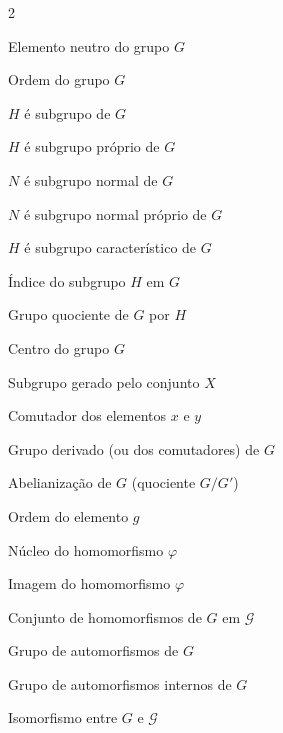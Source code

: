 \documentclass[16pt,openany]{book}
\theoremstyle{definition}
\newcommand{\trianglechareq}{
  \mathrel{
    \unitlength=1mm
    \begin{picture}(5,3)(0,-1.5)
      \polyline(0,0)(4,1.5)(4,-1.5)(0,0)
      \polyline(1.25,0)(3,0.75)(3,-0.75)(1.25,0)
      \polyline(0,-1.9)(4,-1.9)
    \end{picture}
  }
}
\begin{document}
\begin{multicols}{2}
    \begin{description}[leftmargin=2.2cm, labelwidth=1.8cm, labelsep=0.4cm, itemsep=0.3cm, font=\normalfont]
        \item[{ $e$ ou $e_G$}] Elemento neutro do grupo $G$
        \item[{ $|G|$ }] Ordem do grupo $G$
        \item[{ $H \le G$ }] $H$ é subgrupo de $G$
        \item[{ $H < G$ }] $H$ é subgrupo próprio de $G$
        \item[{ $N \trianglelefteq G$ }] $N$ é subgrupo normal de $G$
        \item[{ $N \triangleleft G$ }] $N$ é subgrupo normal próprio de $G$
        \item[{ $H \trianglechareq G$ }] $H$ é subgrupo característico de $G$
        \item[{ $[G:H]$ }] Índice do subgrupo $H$ em $G$
        \item[{ $G/H$ }] Grupo quociente de $G$ por $H$
        \item[{ $Z(G)$ }] Centro do grupo $G$
        \item[{ $\langle X \rangle$ }] Subgrupo gerado pelo conjunto $X$
        \item[{ $[x,y]$ }] Comutador dos elementos $x$ e $y$
        \item[{ $G'$ ou $G^{(1)}$ }] Grupo derivado (ou dos comutadores) de $G$
        \item[{ $G^{ab}$ }] Abelianização de $G$ (quociente $G/G'$)
        \item[{ $\mathcal{O}(g)$ }] Ordem do elemento $g$
        \item[{ $\ker \varphi$ }] Núcleo do homomorfismo $\varphi$
        \item[{ $\operatorname{Im} \varphi$ }] Imagem do homomorfismo $\varphi$
        \item[{ $\operatorname{Hom}(G,\mathcal{G})$ }] Conjunto de homomorfismos de $G$ em $\mathcal{G}$
        \item[{ $\operatorname{Aut}(G)$ }] Grupo de automorfismos de $G$
        \item[{ $\operatorname{Inn}(G)$ }] Grupo de automorfismos internos de $G$
        \item[{ $G \cong \mathcal{G}$ }] Isomorfismo entre $G$ e $\mathcal{G}$
    \end{description}


\end{multicols}
\end{document}
